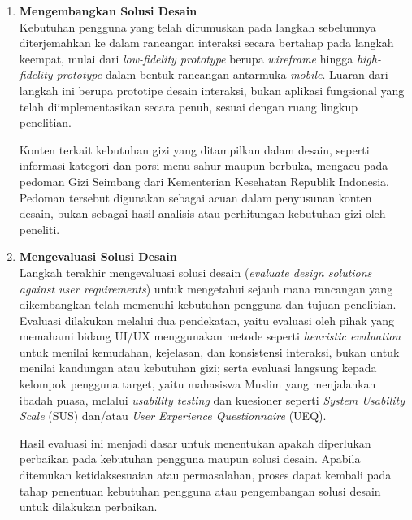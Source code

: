 \begin{enumerate}
    \item \textbf{Mengembangkan Solusi Desain} \\
    Kebutuhan pengguna yang telah dirumuskan pada langkah sebelumnya diterjemahkan ke dalam rancangan interaksi secara bertahap pada langkah keempat, mulai dari \textit{low-fidelity prototype} berupa \textit{wireframe} hingga \textit{high-fidelity prototype} dalam bentuk rancangan antarmuka \textit{mobile}. Luaran dari langkah ini berupa prototipe desain interaksi, bukan aplikasi fungsional yang telah diimplementasikan secara penuh, sesuai dengan ruang lingkup penelitian.

    Konten terkait kebutuhan gizi yang ditampilkan dalam desain, seperti informasi kategori dan porsi menu sahur maupun berbuka, mengacu pada pedoman Gizi Seimbang dari Kementerian Kesehatan Republik Indonesia. Pedoman tersebut digunakan sebagai acuan dalam penyusunan konten desain, bukan sebagai hasil analisis atau perhitungan kebutuhan gizi oleh peneliti.

    \item \textbf{Mengevaluasi Solusi Desain} \\
    Langkah terakhir mengevaluasi solusi desain (\textit{evaluate design solutions against user requirements}) untuk mengetahui sejauh mana rancangan yang dikembangkan telah memenuhi kebutuhan pengguna dan tujuan penelitian. Evaluasi dilakukan melalui dua pendekatan, yaitu evaluasi oleh pihak yang memahami bidang UI/UX menggunakan metode seperti \textit{heuristic evaluation} untuk menilai kemudahan, kejelasan, dan konsistensi interaksi, bukan untuk menilai kandungan atau kebutuhan gizi; serta evaluasi langsung kepada kelompok pengguna target, yaitu mahasiswa Muslim yang menjalankan ibadah puasa, melalui \textit{usability testing} dan kuesioner seperti \textit{System Usability Scale} (SUS) dan/atau \textit{User Experience Questionnaire} (UEQ).

    Hasil evaluasi ini menjadi dasar untuk menentukan apakah diperlukan perbaikan pada kebutuhan pengguna maupun solusi desain. Apabila ditemukan ketidaksesuaian atau permasalahan, proses dapat kembali pada tahap penentuan kebutuhan pengguna atau pengembangan solusi desain untuk dilakukan perbaikan.
\end{enumerate}